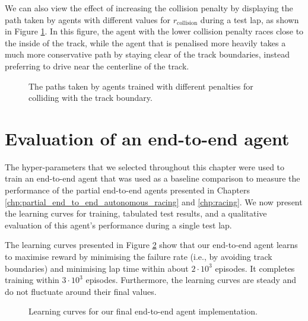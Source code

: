 

We can also view the effect of increasing the collision penalty by displaying the path taken by agents with different values for $r_{\text{collision}}$ during a test lap, as shown in Figure \ref{fig:path_reward_collision}.
In this figure, the agent with the lower collision penalty races close to the inside of the track, while the agent that is penalised more heavily takes a much more conservative path by staying clear of the track boundaries, instead preferring to drive near the centerline of the track.

\begin{figure}[htb!]
    \centering
    
    \caption[Paths taken by agents trained with different collision penalties]{The paths taken by agents trained with different penalties for colliding with the track boundary.}
    \label{fig:path_reward_collision}
\end{figure}


\section{Evaluation of an end-to-end agent}
The hyper-parameters that we selected throughout this chapter were used to train an end-to-end agent that was used as a baseline comparison to measure the performance of the partial end-to-end agents presented in Chapters \ref{chp:partial_end_to_end_autonomous_racing} and \ref{chp:racing}.
We now present the learning curves for training, tabulated test results, and a qualitative evaluation of this agent's performance during a single test lap.

The learning curves presented in Figure \ref{fig:end_to_end_learning} show that our end-to-end agent learns to maximise reward by minimising the failure rate (i.e., by avoiding track boundaries) and minimising lap time within about $2\cdot10^3$ episodes.
It completes training within $3\cdot10^3$ episodes.
Furthermore, the learning curves are steady and do not fluctuate around their final values.

\begin{figure}[htb!]
    \centering
    
    \caption[Learning curves for final end-to-end agent]{Learning curves for our final end-to-end agent implementation.}
    \label{fig:end_to_end_learning}
\end{figure}

